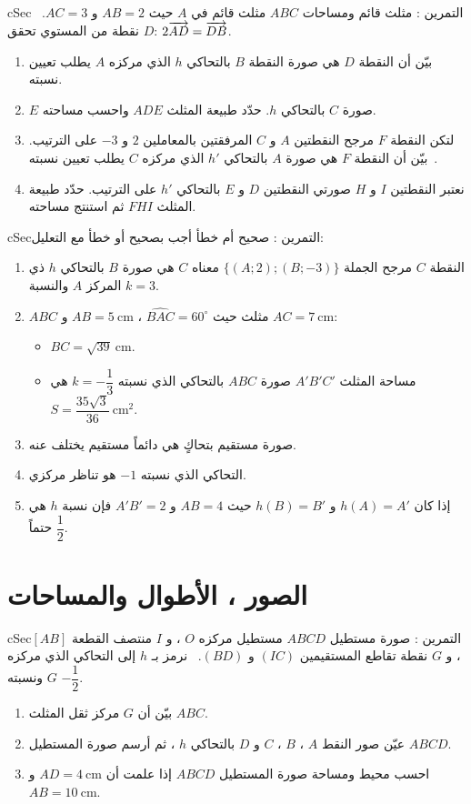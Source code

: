 \documentclass[12pt,a4paper]{article}
\newenvironment{BOX}[2]{\begin{otherlanguage}{english}\begin{arbox}{#1}{#2}}{\end{arbox}\end{otherlanguage}}
\newcounter{exo}
\newenvironment{tamrin}[1]{\stepcounter{exo}\begin{BOX}{cSec}{التمرين \theexo: #1}}{\end{BOX}}
\newenvironment{sq}{\begin{itemize}[leftmargin=2.4em,itemsep=3pt]}{\end{itemize}}
\newcommand{\qa}{\item[(أ)]}\newcommand{\qb}{\item[(ب)]}\newcommand{\qc}{\item[(جـ)]}\newcommand{\qd}{\item[(د)]}\newcommand{\qe}{\item[(هـ)]}
\begin{document}
\begin{tamrin}{مثلث قائم ومساحات}
$ABC$ مثلث قائم في $A$ حيث $AB=2$ و $AC=3$. \ $D$ نقطة من المستوي تحقق: $2\overrightarrow{AD}=\overrightarrow{DB}$.
\begin{enumerate}
\item بيّن أن النقطة $D$ هي صورة النقطة $B$ بالتحاكي $h$ الذي مركزه $A$ يطلب تعيين نسبته.
\item $E$ صورة $C$ بالتحاكي $h$. حدّد طبيعة المثلث $ADE$ واحسب مساحته.
\item لتكن النقطة $F$ مرجح النقطتين $A$ و $C$ المرفقتين بالمعاملين $2$ و $-3$ على الترتيب. \ بيّن أن النقطة $F$ هي صورة $A$ بالتحاكي $h'$ الذي مركزه $C$ يطلب تعيين نسبته.
\item نعتبر النقطتين $I$ و $H$ صورتي النقطتين $D$ و $E$ بالتحاكي $h'$ على الترتيب. حدّد طبيعة المثلث $FHI$ ثم استنتج مساحته.
\end{enumerate}
\end{tamrin}

\begin{tamrin}{صحيح أم خطأ}
أجب بصحيح أو خطأ مع التعليل:
\begin{enumerate}
\item النقطة $C$ مرجح الجملة $\{(A;2);(B;-3)\}$ معناه $C$ هي صورة $B$ بالتحاكي $h$ ذي المركز $A$ والنسبة $k=3$.
\item $ABC$ مثلث حيث $\widehat{BAC}=60^\circ$ ، $AB=5\ \text{cm}$ و $AC=7\ \text{cm}$:
\begin{sq}
\qa $BC=\sqrt{39}\ \text{cm}$.
\qb مساحة المثلث $A'B'C'$ صورة $ABC$ بالتحاكي الذي نسبته $k=-\dfrac13$ هي $S=\dfrac{35\sqrt3}{36}\ \text{cm}^2$.
\end{sq}
\item صورة مستقيم بتحاكٍ هي دائماً مستقيم يختلف عنه.
\item التحاكي الذي نسبته $-1$ هو تناظر مركزي.
\item إذا كان $h(A)=A'$ و $h(B)=B'$ حيث $AB=4$ و $A'B'=2$ فإن نسبة $h$ هي حتماً $\dfrac12$.
\end{enumerate}
\end{tamrin}

\section{الصور ، الأطوال والمساحات}
\begin{tamrin}{صورة مستطيل}
$ABCD$ مستطيل مركزه $O$ ، و $I$ منتصف القطعة $[AB]$ ، و $G$ نقطة تقاطع المستقيمين $(IC)$ و $(BD)$. \ نرمز بـ $h$ إلى التحاكي الذي مركزه $G$ ونسبته $-\dfrac12$.
\begin{enumerate}
\item بيّن أن $G$ مركز ثقل المثلث $ABC$.
\item عيّن صور النقط $A$ ، $B$ ، $C$ و $D$ بالتحاكي $h$ ، ثم أرسم صورة المستطيل $ABCD$.
\item احسب محيط ومساحة صورة المستطيل $ABCD$ إذا علمت أن $AD=4\ \text{cm}$ و $AB=10\ \text{cm}$.
\end{enumerate}
\end{tamrin}
\end{document}
